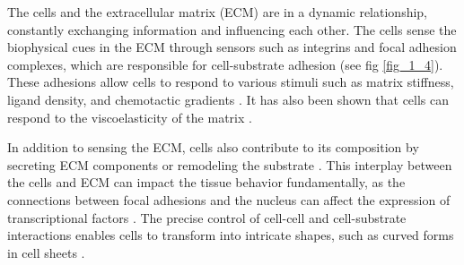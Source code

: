 The cells and the extracellular matrix (ECM) are in a dynamic relationship, constantly exchanging information and influencing each other. The cells sense the biophysical cues in the ECM through sensors such as integrins and focal adhesion complexes, which are responsible for cell-substrate adhesion \cite{kechagia2019} (see fig \ref{fig_1_4}). These adhesions allow cells to respond to various stimuli such as matrix stiffness, ligand density, and chemotactic gradients \cite{fortunato2022}. It has also been shown that cells can respond to the viscoelasticity of the matrix \cite{elosegui-artola2022}.

In addition to sensing the ECM, cells also contribute to its composition by secreting ECM components or remodeling the substrate \cite{malandrino2018}. This interplay between the cells and ECM can impact the tissue behavior fundamentally, as the connections between focal adhesions and the nucleus can affect the expression of transcriptional factors \cite{venturini2020, lomakin2020}. The precise control of cell-cell and cell-substrate interactions enables cells to transform into intricate shapes, such as curved forms in cell sheets \cite{schamberger2022}.

